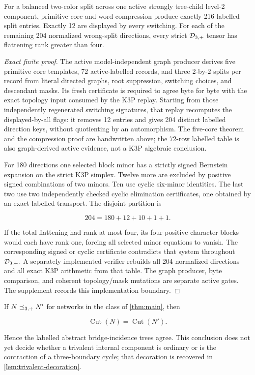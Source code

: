 \begin{lemma}\label{lem:one-active}
For a balanced two-color split across one active strongly tree-child
level-2 component, primitive-core and word compression produce exactly 216
labelled split entries.  Exactly 12 are displayed by every switching.
For each of the remaining 204 normalized wrong-split directions, every
strict \(\mathcal D_{3,+}\) tensor has flattening rank greater than four.
\end{lemma}

\begin{proof}[Exact finite proof]
The active model-independent graph producer derives five primitive core
templates, 72 active-labelled records, and three \(2\)-by-\(2\) splits per
record from literal directed graphs, root suppression, switching choices, and
descendant masks.  Its fresh certificate is required to agree byte for byte
with the exact topology input consumed by the K3P replay.  Starting from those
independently regenerated switching signatures, that replay recomputes the
displayed-by-all flags: it removes 12 entries and gives 204 distinct labelled
direction keys, without quotienting by an automorphism.  The five-core theorem
and the compression proof are handwritten above; the 72-row labelled table is
also graph-derived active evidence, not a K3P algebraic conclusion.

For 180 directions one selected block minor has a strictly signed
Bernstein expansion on the strict K3P simplex.  Twelve more are excluded by
positive signed combinations of two minors.  Ten use cyclic six-minor
identities.  The last two use two independently checked cyclic elimination
certificates, one obtained by an exact labelled transport.  The disjoint
partition is

\[
 204=180+12+10+1+1.
\]

If the total flattening had rank at most four, its four positive character
blocks would each have rank one, forcing all selected minor equations to
vanish.  The corresponding signed or cyclic certificate contradicts that
system throughout \(\mathcal D_{3,+}\).  A separately implemented verifier rebuilds all
204 normalized directions and all exact K3P arithmetic from that table.  The
graph producer, byte comparison, and coherent topology/mask mutations are
separate active gates.  The supplement records this implementation boundary.
\end{proof}

\begin{theorem}
\label{thm:cut-transfer}
If \(N\preceq_{3,+} N'\) for networks in the class of \cref{thm:main}, then

\[
 \operatorname{Cut}(N)=\operatorname{Cut}(N').
\]

Hence the labelled abstract bridge-incidence trees agree.  This conclusion
does not yet decide whether a trivalent internal component is ordinary or is
the contraction of a three-boundary cycle; that decoration is recovered in
\cref{lem:trivalent-decoration}.
\end{theorem}

